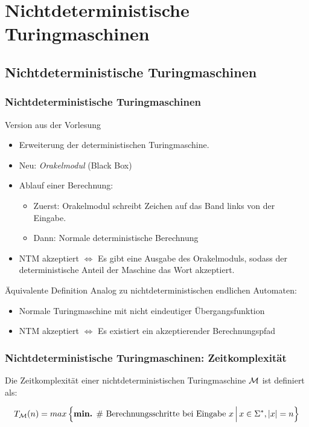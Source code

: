 \section{Nichtdeterministische Turingmaschinen}
\subsection{Nichtdeterministische Turingmaschinen}
\begin{frame}
\frametitle{Nichtdeterministische Turingmaschinen}

\begin{block}{Version aus der Vorlesung}
\begin{itemize}
\item Erweiterung der deterministischen Turingmaschine.
\item Neu: \emph{Orakelmodul} (Black Box)
\item Ablauf einer Berechnung:
\begin{itemize}
	\item Zuerst: Orakelmodul schreibt Zeichen auf das Band links von der Eingabe.
	\item Dann: Normale deterministische Berechnung
 \end{itemize}
\item NTM akzeptiert $\Leftrightarrow$ Es gibt eine Ausgabe des Orakelmoduls, sodass der deterministische Anteil der Maschine das Wort akzeptiert.
\end{itemize}
\end{block}

\pause

\begin{block}{Äquivalente Definition}
Analog zu nichtdeterministischen endlichen Automaten:
\begin{itemize}
\item Normale Turingmaschine mit nicht eindeutiger Übergangsfunktion
\item NTM akzeptiert $\Leftrightarrow$ Es existiert ein akzeptierender Berechnungspfad
\end{itemize}
\end{block}
\end{frame}

\begin{frame}
\frametitle{Nichtdeterministische Turingmaschinen: Zeitkomplexität}
	Die Zeitkomplexität einer nichtdeterministischen Turingmaschine $\mathcal{M}$ ist definiert als:
	
	$$T_{\mathcal{M}}(n) = max \left\lbrace \vphantom{x^j_j}\text{\textbf{min.} \# Berechnungsschritte bei Eingabe $x$} \,\middle\vert\, x \in \Sigma^*, \left\vert x \right\vert = n \right\rbrace$$
	
	
\end{frame}

